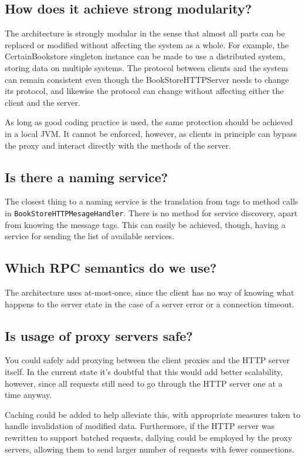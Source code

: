 \documentclass[11pt,a4paper]{article}
\begin{document}
\subsection{How does it achieve strong modularity?}
The architecture is strongly modular in the sense that almost all parts can be
replaced or modified without affecting the system as a whole. For example, the
CertainBookstore singleton instance can be made to use a distributed system,
storing data on multiple systems. The protocol between clients and the system
can remain consistent even though the BookStoreHTTPServer needs to change its
protocol, and likewise the protocol can change without affecting either the
client and the server.

As long as good coding practice is used, the same protection should be achieved
in a local JVM. It cannot be enforced, however, as clients in principle can
bypass the proxy and interact directly with the methods of the server.

\subsection{Is there a naming service?}
The closest thing to a naming service is the translation from tags to method
calls in \texttt{BookStoreHTTPMesageHandler}. There is no method for service
discovery, apart from knowing the message tags. This can easily be achieved,
though, having a service for sending the list of available services.

\subsection{Which RPC semantics do we use?}
The architecture uses at-most-once, since the client has no way of knowing
what happens to the server state in the case of a server error or a connection
timeout.

\subsection{Is usage of proxy servers safe?}
You could safely add proxying between the client proxies and the HTTP server
itself. In the current state it's doubtful that this would add better
scalability, however, since all requests still need to go through the HTTP
server one at a time anyway.

Caching could be added to help alleviate this, with appropriate measures taken
to handle invalidation of modified data. Furthermore, if the HTTP server was
rewritten to support batched requests, dallying could be employed by the proxy
servers, allowing them to send larger number of requests with fewer connections.
\end{document}
